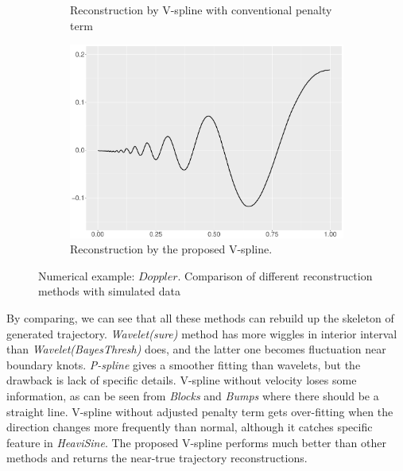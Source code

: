 \begin{figure}
\begin{subfigure}{0.45\textwidth}
    \caption{Reconstruction by V-spline with conventional penalty term}
    \end{subfigure}
    \begin{subfigure}{0.45\textwidth}
    \centering
    \includegraphics[width=\linewidth,height=0.45\textwidth]{Chapters/02TractorSplineTheory/plot/ggplot/ggDopplerTractor.pdf}
    \caption{Reconstruction by the proposed V-spline.}
    \end{subfigure}
\caption{Numerical example: $\textit{Doppler}$. Comparison of different reconstruction methods with simulated data}\label{num4}
 \end{figure}

By comparing, we can see that all these methods can rebuild up the skeleton of generated trajectory. \textit{Wavelet(sure)} method has more wiggles in interior interval than \textit{Wavelet(BayesThresh)} does, and the latter one becomes fluctuation near boundary knots. \textit{P-spline} gives a smoother fitting than wavelets, but the drawback is lack of specific details. V-spline without velocity loses some information, as can be seen from \textit{Blocks} and \textit{Bumps} where there should be a straight line. V-spline without adjusted penalty term gets over-fitting when the direction changes more frequently than normal, although it catches specific feature in \textit{HeaviSine}. The proposed V-spline performs much better than other methods and returns the near-true trajectory reconstructions.  




